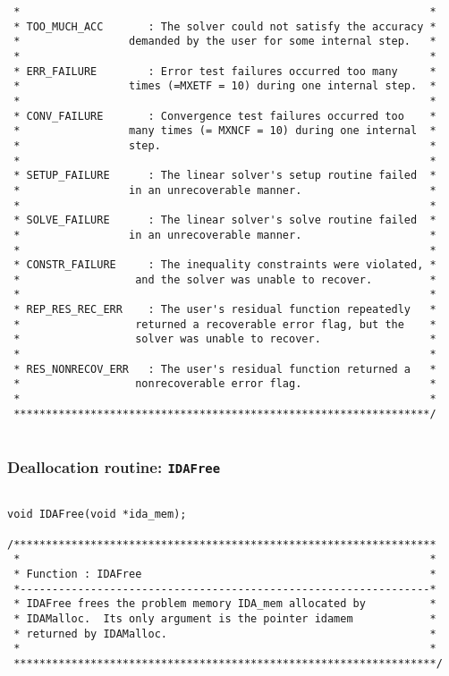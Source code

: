 \begin{verbatim}
 *                                                                *
 * TOO_MUCH_ACC       : The solver could not satisfy the accuracy *
 *                 demanded by the user for some internal step.   *
 *                                                                *
 * ERR_FAILURE        : Error test failures occurred too many     *
 *                 times (=MXETF = 10) during one internal step.  *
 *                                                                *
 * CONV_FAILURE       : Convergence test failures occurred too    *
 *                 many times (= MXNCF = 10) during one internal  * 
 *                 step.                                          *
 *                                                                *
 * SETUP_FAILURE      : The linear solver's setup routine failed  *
 *                 in an unrecoverable manner.                    *
 *                                                                *
 * SOLVE_FAILURE      : The linear solver's solve routine failed  *
 *                 in an unrecoverable manner.                    *
 *                                                                *
 * CONSTR_FAILURE     : The inequality constraints were violated, *
 *                  and the solver was unable to recover.         *
 *                                                                *
 * REP_RES_REC_ERR    : The user's residual function repeatedly   *
 *                  returned a recoverable error flag, but the    *
 *                  solver was unable to recover.                 *
 *                                                                *
 * RES_NONRECOV_ERR   : The user's residual function returned a   *
 *                  nonrecoverable error flag.                    *
 *                                                                *
 *****************************************************************/
 
\end{verbatim}
\normalsize


\newpage

\subsubsection{Deallocation routine: {\tt IDAFree}}

\small
\begin{verbatim}

void IDAFree(void *ida_mem);

/******************************************************************
 *                                                                *
 * Function : IDAFree                                             *
 *----------------------------------------------------------------*
 * IDAFree frees the problem memory IDA_mem allocated by          *
 * IDAMalloc.  Its only argument is the pointer idamem            *
 * returned by IDAMalloc.                                         *
 *                                                                *
 ******************************************************************/

\end{verbatim}
\normalsize 


